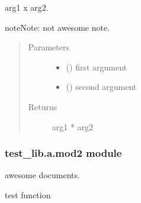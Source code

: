 \documentclass[letterpaper,10pt,dvipdfmx]{sphinxmanual}
\begin{document}

\begin{fulllineitems}
\label{\detokenize{test_lib.a:test_lib.a.mod1.func2}}
arg1 x arg2.

\begin{sphinxadmonition}{note}{Note:}
not awesome note.
\end{sphinxadmonition}
\begin{quote}\begin{description}
\item[{Parameters}] \leavevmode\begin{itemize}
\item {} 
 () \sphinxhyphen{}\sphinxhyphen{} first argument

\item {} 
 () \sphinxhyphen{}\sphinxhyphen{} second argument

\end{itemize}

\item[{Returns}] \leavevmode
arg1 * arg2

\end{description}\end{quote}

\end{fulllineitems}



\subsubsection{test\_lib.a.mod2 module}
\label{\detokenize{test_lib.a:module-test_lib.a.mod2}}\label{\detokenize{test_lib.a:test-lib-a-mod2-module}}
awesome documents.

\begin{fulllineitems}
\label{\detokenize{test_lib.a:test_lib.a.mod2.func}}
test function

\end{fulllineitems}
\end{document}
